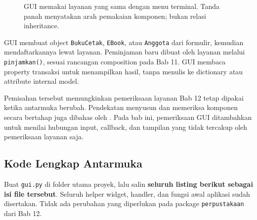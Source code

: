 \begin{figure}[htbp]
\centering
{}
\caption{GUI memakai layanan yang sama dengan menu terminal. Tanda panah menyatakan arah pemakaian komponen; bukan relasi inheritance.}
\label{fig:b13-integrasi}
\end{figure}

GUI membuat object \texttt{BukuCetak}, \texttt{EBook}, atau \texttt{Anggota} dari formulir, kemudian mendaftarkannya lewat layanan. Peminjaman baru dibuat oleh layanan melalui \texttt{pinjamkan()}, sesuai rancangan composition pada Bab 11. GUI membaca property transaksi untuk menampilkan hasil, tanpa menulis ke dictionary atau attribute internal model.

Pemisahan tersebut memungkinkan pemeriksaan layanan Bab 12 tetap dipakai ketika antarmuka berubah. Pendekatan menyusun dan memeriksa komponen secara bertahap juga dibahas oleh \cite{wilson2024design}. Pada bab ini, pemeriksaan GUI ditambahkan untuk menilai hubungan input, callback, dan tampilan yang tidak tercakup oleh pemeriksaan layanan saja.

\subsection{Kode Lengkap Antarmuka}

Buat \texttt{gui.py} di folder utama proyek, lalu salin \textbf{seluruh listing berikut sebagai isi file tersebut}. Seluruh helper widget, handler, dan fungsi awal aplikasi sudah disertakan. Tidak ada perubahan yang diperlukan pada package \texttt{perpustakaan} dari Bab 12.

